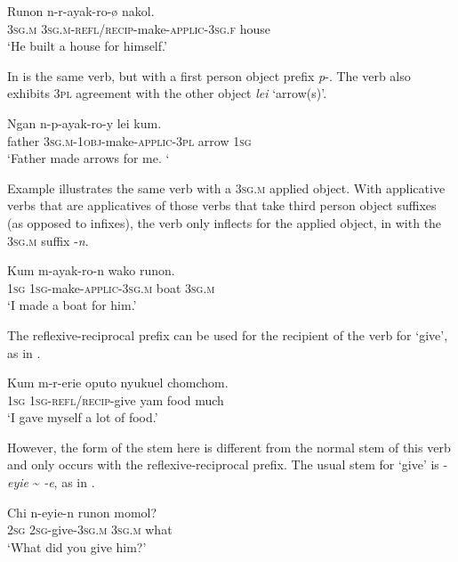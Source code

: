 \documentclass[output=paper]{langscibook}
\begin{document}
\ea%
    \label{ex:Brown:12}
    \gll Runon  n-r-ayak-ro-ø  nakol.\\
 \textsc{3sg.m}  \textsc{3sg.m-refl/recip-}make\textsc{{}-applic-3sg.f}  house\\
    \glt  ‘He built a house for himself.’
    \z


In  is the same verb, but with a first person object prefix \emph{p}{}-. The verb also exhibits \textsc{3pl} agreement with the other object \emph{lei} ‘arrow(s)’.


\ea%
    \label{ex:Brown:13}
    \gll Ngan  n-p-ayak-ro-y  lei  kum.\\
 father  \textsc{3sg.m-1obj-}make\textsc{{}-applic-3pl}  arrow  \textsc{1sg}\\
    \glt ‘Father made arrows for me. ‘
    \z

Example  illustrates the same verb with a \textsc{3sg.m} applied object. With applicative verbs that are applicatives of those verbs that take third person object suffixes (as opposed to infixes), the verb only inflects for the applied object, in  with the \textsc{3sg.m} suffix -\emph{n}.

\ea%
    \label{ex:Brown:14}
    \gll Kum  m-ayak-ro-n  wako  runon.\\
 \textsc{1sg}  \textsc{1sg}{}-make-\textsc{applic}{}-\textsc{3sg.m}  boat  \textsc{3sg.m}\\
    \glt ‘I made a boat for him.’
    \z


 The reflexive-reciprocal prefix can be used for the recipient of the verb for ‘give’, as in .


\ea%
    \label{ex:Brown:15}
    \gll Kum  m-r-erie  oputo  nyukuel  chomchom.\\
 \textsc{1sg}  \textsc{1sg}{}-\textsc{refl/recip}{}-give  yam  food  much\\
    \glt  ‘I gave myself a lot of food.’
    \z

However, the form of the stem here is different from the normal stem of this verb and only occurs with the reflexive-reciprocal prefix. The usual stem for ‘give’ is -\emph{eyie} {\textasciitilde}\emph{ -e}, as in .


\ea%
    \label{ex:Brown:16}
    \gll Chi  n-eyie-n  runon  momol?\\
 \textsc{2sg}  \textsc{2sg}{}-give-\textsc{3sg.m}  \textsc{3sg.m}  what\\
    \glt ‘What did you give him?’
    \z
\end{document}

